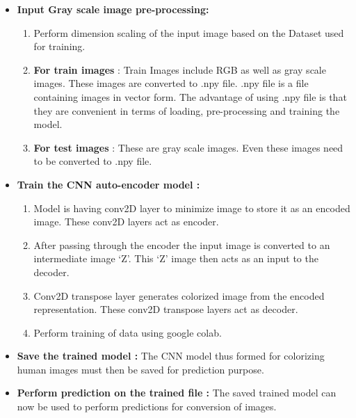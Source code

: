 \documentclass[12pt]{report}	%
\begin{document}
\begin{itemize}


\item
{\bfseries Input Gray scale image pre-processing:}

			\begin{enumerate}
			
			    \item	
	                Perform dimension scaling of the input image based on the Dataset used for training.

				\item
					{\bfseries For train images }: Train Images include RGB as well as gray scale images. These images are converted to .npy file. .npy file is a file containing images in vector form. The advantage of using .npy file is that they are convenient in terms of loading, pre-processing and training the model.
				\item
					{\bfseries For test images }: These are gray scale images. Even these images need to be converted to .npy file.

\end{enumerate}
	

\item{\bfseries Train the CNN auto-encoder model : } 
\begin{enumerate}

	\item
	Model is having conv2D layer to minimize image to store it as an encoded image. These conv2D layers act as encoder.
	\item
	After passing through the encoder the input image is converted to an intermediate image ‘Z’. This ‘Z’ image then acts as an input to the decoder.
	\item
	Conv2D transpose layer generates colorized image from the encoded representation. These conv2D transpose layers act as decoder.
	\item
	Perform training of data using google colab.

\end{enumerate}

\item
{\bfseries Save the trained model :} The CNN model thus formed for colorizing human images must then be saved for prediction purpose.

\item
{\bfseries Perform prediction on the trained file :} The saved trained model can now be used to perform predictions for conversion of images.


\end{itemize}
\end{document}
